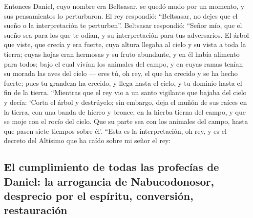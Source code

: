  Entonces Daniel, cuyo nombre era Beltsasar, se quedó
mudo por un momento, y sus pensamientos lo perturbaron. El rey
respondió: ``Beltsasar, no dejes que el sueño o la interpretación te
perturben''. Beltsasar respondió: ``Señor mío, que el sueño sea para los
que te odian, y su interpretación para tus adversarios. 
El árbol que viste, que crecía y era fuerte, cuya altura llegaba al
cielo y su vista a toda la tierra;  cuyas hojas eran
hermosas y su fruto abundante, y en él había alimento para todos; bajo
el cual vivían los animales del campo, y en cuyas ramas tenían su morada
las aves del cielo ---  eres tú, oh rey, el que ha
crecido y se ha hecho fuerte; pues tu grandeza ha crecido, y llega hasta
el cielo, y tu dominio hasta el fin de la tierra. 
``Mientras que el rey vio a un santo vigilante que bajaba del cielo y
decía: `Corta el árbol y destrúyelo; sin embargo, deja el muñón de sus
raíces en la tierra, con una banda de hierro y bronce, en la hierba
tierna del campo, y que se moje con el rocío del cielo. Que su parte sea
con los animales del campo, hasta que pasen siete tiempos sobre él'.
 ``Esta es la interpretación, oh rey, y es el decreto del
Altísimo que ha caído sobre mi señor el rey:

\hypertarget{el-cumplimiento-de-todas-las-profecuxedas-de-daniel-la-arrogancia-de-nabucodonosor-desprecio-por-el-espuxedritu-conversiuxf3n-restauraciuxf3n}{%
\subsection{El cumplimiento de todas las profecías de Daniel: la
arrogancia de Nabucodonosor, desprecio por el espíritu, conversión,
restauración}\label{el-cumplimiento-de-todas-las-profecuxedas-de-daniel-la-arrogancia-de-nabucodonosor-desprecio-por-el-espuxedritu-conversiuxf3n-restauraciuxf3n}}

